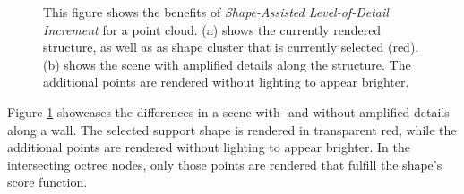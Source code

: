 \begin{figure}
\centering
{}\par\medskip
{}
\caption{This figure shows the benefits of \textit{Shape-Assisted Level-of-Detail Increment} for a point cloud. (a) shows the currently rendered structure, as well as as shape cluster that is currently selected (red). (b) shows the scene with amplified details along the structure. The additional points are rendered without lighting to appear brighter.}
\label{fig:lod_increment}
\end{figure}

Figure \ref{fig:lod_increment} showcases the differences in a scene with- and without amplified details along a wall. The selected support shape is rendered in transparent red, while the additional points are rendered without lighting to appear brighter. In the intersecting octree nodes, only those points are rendered that fulfill the shape's score function. 


